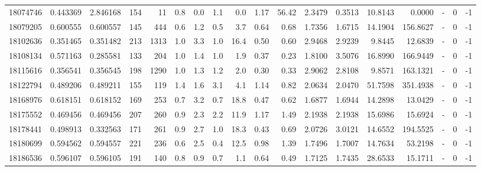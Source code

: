 \begin{tabular}{rrrrrrrrrrrrrrrlrr}
  18074746 & 0.443369 &   2.846168 &  154 &   11 &      0.8 &      0.0 &     1.1 &      0.0 &       1.17 &       56.42 &  2.3479 &  0.3513 &   10.8143 &    0.0000 &             - &        0 &         -1 \\
  18079205 & 0.600555 &   0.600557 &  145 &  444 &      0.6 &      1.2 &     0.5 &      3.7 &       0.64 &        0.68 &  1.7356 &  1.6715 &   14.1904 &  156.8627 &             - &        0 &         -1 \\
  18102636 & 0.351465 &   0.351482 &  213 & 1313 &      1.0 &      3.3 &     1.0 &     16.4 &       0.50 &        0.60 &  2.9468 &  2.9239 &    9.8445 &   12.6839 &             - &        0 &         -1 \\
  18108134 & 0.571163 &   0.285581 &  133 &  204 &      1.0 &      1.4 &     1.0 &      1.9 &       0.37 &        0.23 &  1.8100 &  3.5076 &   16.8990 &  166.9449 &             - &        0 &         -1 \\
  18115616 & 0.356541 &   0.356545 &  198 & 1290 &      1.0 &      1.3 &     1.2 &      2.0 &       0.30 &        0.33 &  2.9062 &  2.8108 &    9.8571 &  163.1321 &             - &        0 &         -1 \\
  18122794 & 0.489206 &   0.489211 &  155 &  119 &      1.4 &      1.6 &     3.1 &      4.1 &       1.14 &        0.82 &  2.0634 &  2.0470 &   51.7598 &  351.4938 &             - &        0 &         -1 \\
  18168976 & 0.618151 &   0.618152 &  169 &  253 &      0.7 &      3.2 &     0.7 &     18.8 &       0.47 &        0.62 &  1.6877 &  1.6944 &   14.2898 &   13.0429 &             - &        0 &         -1 \\
  18175552 & 0.469456 &   0.469456 &  207 &  260 &      0.9 &      2.3 &     2.2 &     11.9 &       1.17 &        1.49 &  2.1938 &  2.1938 &   15.6986 &   15.6924 &             - &        0 &         -1 \\
  18178441 & 0.498913 &   0.332563 &  171 &  261 &      0.9 &      2.7 &     1.0 &     18.3 &       0.43 &        0.69 &  2.0726 &  3.0121 &   14.6552 &  194.5525 &             - &        0 &         -1 \\
  18180699 & 0.594562 &   0.594557 &  221 &  236 &      0.6 &      2.5 &     0.4 &     12.5 &       0.98 &        1.39 &  1.7496 &  1.7007 &   14.7634 &   53.2198 &             - &        0 &         -1 \\
  18186536 & 0.596107 &   0.596105 &  191 &  140 &      0.8 &      0.9 &     0.7 &      1.1 &       0.64 &        0.49 &  1.7125 &  1.7435 &   28.6533 &   15.1711 &             - &        0 &         -1 \\

\end{tabular}
